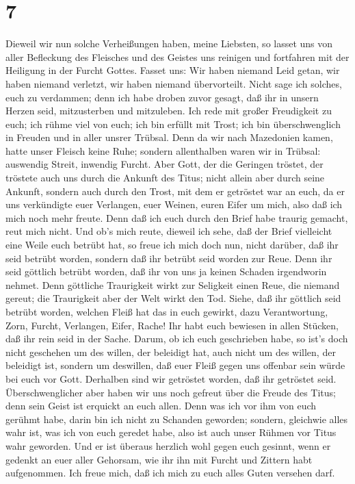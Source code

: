 \hypertarget{section-6}{%
\section{7}\label{section-6}}

 Dieweil wir nun solche Verheißungen haben, meine Liebsten,
so lasset uns von aller Befleckung des Fleisches und des Geistes uns
reinigen und fortfahren mit der Heiligung in der Furcht Gottes.
 Fasset uns: Wir haben niemand Leid getan, wir haben niemand
verletzt, wir haben niemand übervorteilt.  Nicht sage ich
solches, euch zu verdammen; denn ich habe droben zuvor gesagt, daß ihr
in unsern Herzen seid, mitzusterben und mitzuleben.  Ich
rede mit großer Freudigkeit zu euch; ich rühme viel von euch; ich bin
erfüllt mit Trost; ich bin überschwenglich in Freuden und in aller
unsrer Trübsal.  Denn da wir nach Mazedonien kamen, hatte
unser Fleisch keine Ruhe; sondern allenthalben waren wir in Trübsal:
auswendig Streit, inwendig Furcht.  Aber Gott, der die
Geringen tröstet, der tröstete auch uns durch die Ankunft des Titus;
 nicht allein aber durch seine Ankunft, sondern auch durch
den Trost, mit dem er getröstet war an euch, da er uns verkündigte euer
Verlangen, euer Weinen, euren Eifer um mich, also daß ich mich noch mehr
freute.  Denn daß ich euch durch den Brief habe traurig
gemacht, reut mich nicht. Und ob's mich reute, dieweil ich sehe, daß der
Brief vielleicht eine Weile euch betrübt hat,  so freue ich
mich doch nun, nicht darüber, daß ihr seid betrübt worden, sondern daß
ihr betrübt seid worden zur Reue. Denn ihr seid göttlich betrübt worden,
daß ihr von uns ja keinen Schaden irgendworin nehmet.  Denn
göttliche Traurigkeit wirkt zur Seligkeit einen Reue, die niemand
gereut; die Traurigkeit aber der Welt wirkt den Tod. 
Siehe, daß ihr göttlich seid betrübt worden, welchen Fleiß hat das in
euch gewirkt, dazu Verantwortung, Zorn, Furcht, Verlangen, Eifer, Rache!
Ihr habt euch bewiesen in allen Stücken, daß ihr rein seid in der Sache.
 Darum, ob ich euch geschrieben habe, so ist's doch nicht
geschehen um des willen, der beleidigt hat, auch nicht um des willen,
der beleidigt ist, sondern um deswillen, daß euer Fleiß gegen uns
offenbar sein würde bei euch vor Gott.  Derhalben sind wir
getröstet worden, daß ihr getröstet seid. Überschwenglicher aber haben
wir uns noch gefreut über die Freude des Titus; denn sein Geist ist
erquickt an euch allen.  Denn was ich vor ihm von euch
gerühmt habe, darin bin ich nicht zu Schanden geworden; sondern,
gleichwie alles wahr ist, was ich von euch geredet habe, also ist auch
unser Rühmen vor Titus wahr geworden.  Und er ist überaus
herzlich wohl gegen euch gesinnt, wenn er gedenkt an euer aller
Gehorsam, wie ihr ihn mit Furcht und Zittern habt aufgenommen.
 Ich freue mich, daß ich mich zu euch alles Guten versehen
darf.

